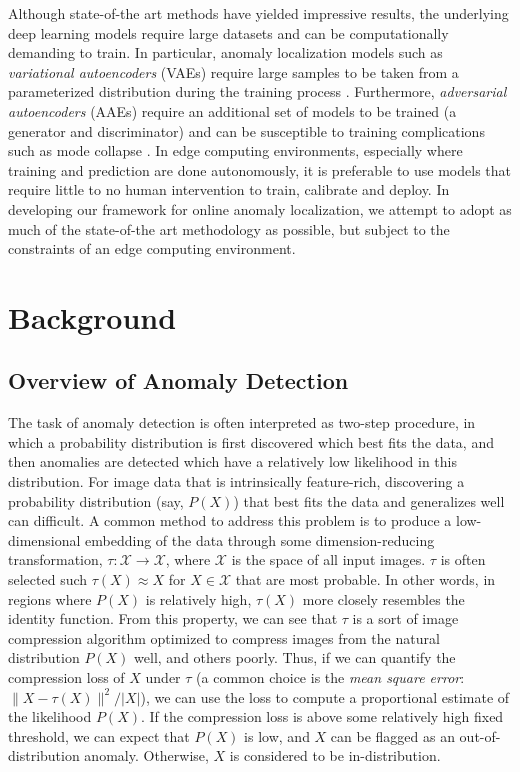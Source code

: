 \documentclass[12pt]{article}
\begin{document}
Although state-of-the art methods have yielded impressive results, the underlying deep learning models require large datasets and can be computationally demanding to train. In particular, anomaly localization models such as \textit{variational autoencoders} (VAEs) require large samples to be taken from a parameterized distribution during the training process \cite{avb_model}. Furthermore, \textit{adversarial autoencoders} (AAEs) require an additional set of models to be trained (a generator and discriminator) and can be susceptible to training complications such as mode collapse \cite{kumar_mask_aae, avb_model}. In edge computing environments, especially where training and prediction are done autonomously, it is preferable to use models that require little to no human intervention to train, calibrate and deploy. In developing our framework for online anomaly localization, we attempt to adopt as much of the state-of-the art methodology as possible, but subject to the constraints of an edge computing environment.



\section{Background}
\subsection{Overview of Anomaly Detection}

The task of anomaly detection is often interpreted as two-step procedure, in which a probability distribution is first discovered which best fits the data, and then anomalies are detected which have a relatively low likelihood in this distribution. For image data that is intrinsically feature-rich, discovering a probability distribution (say, $P(X)$) that best fits the data and generalizes well can difficult. A common method to address this problem is to produce a low-dimensional embedding of the data through some dimension-reducing transformation, $\tau: \mathcal{X} \rightarrow \mathcal{X}$, where $\mathcal{X}$ is the space of all input images. $\tau$ is often selected such  $\tau(X) \approx X$ for $X \in \mathcal{X}$ that are most probable. In other words, in regions where $P(X)$ is relatively high, $\tau(X)$ more closely resembles the identity function. From this property, we can see that $\tau$ is a sort of image compression algorithm optimized to compress images from the natural distribution $P(X)$ well, and others poorly. Thus, if we can quantify the compression loss of $X$ under $\tau$ (a common choice is the \textit{mean square error}: $\lVert X - \tau(X)\rVert^2 / |X|$), we can use the loss to compute a proportional estimate of the likelihood $P(X)$. If the compression loss is above some relatively high fixed threshold, we can expect that $P(X)$ is low, and $X$ can be flagged as an out-of-distribution anomaly. Otherwise, $X$ is considered to be in-distribution.\\
\end{document}
